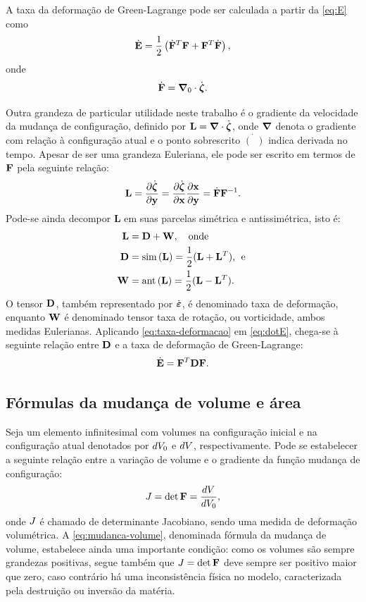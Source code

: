 \documentclass[Tese.tex]{subfiles}
\begin{document}
A taxa da deformação de Green-Lagrange pode ser calculada a partir da \cref{eq:E} como
\begin{equation}\label{eq:dotE}
\dot{\mathbf{E}} = \dfrac{1}{2}\left(\dot{\mathbf{F}}^T\mathbf{F}+\mathbf{F}^T\dot{\mathbf{F}}\right),
\end{equation}
onde 
\begin{equation}
\dot{\mathbf{F}} = \boldsymbol{\nabla}_0\cdot\dot{\boldsymbol{\zeta}}.
\end{equation}

Outra grandeza de particular utilidade neste trabalho é o gradiente da velocidade da mudança de configuração, definido por $\mathbf{L} = \boldsymbol{\nabla}\cdot\dot{\boldsymbol{\zeta}}$, onde $\boldsymbol{\nabla}$ denota o gradiente com relação à configuração atual e o ponto sobrescrito $\dot{(\;\,)}$ indica derivada no tempo. Apesar de ser uma grandeza Euleriana, ele pode ser escrito em termos de $\mathbf{F}$ pela seguinte relação:
\begin{equation}\label{eq:gradiente-velocidade}
\mathbf{L} = \dfrac{\partial\dot{\boldsymbol{\zeta}}}{\partial\mathbf{y}}=\dfrac{\partial\dot{\boldsymbol{\zeta}}}{\partial\mathbf{x}}\dfrac{\partial\mathbf{x}}{\partial\mathbf{y}} = \dot{\mathbf{F}}\mathbf{F}^{-1}.
\end{equation}
Pode-se ainda decompor $\mathbf{L}$ em suas parcelas simétrica e antissimétrica, isto é:
\begin{align}
\mathbf{L} &= \mathbf{D}+\mathbf{W}, \text{\quad onde} \\
\mathbf{D} &= \text{sim}\,(\mathbf{L})=\dfrac{1}{2}(\mathbf{L}+\mathbf{L}^T) \text{,\; e} \label{eq:taxa-deformacao} \\
\mathbf{W} &= \text{ant}\,(\mathbf{L})=\dfrac{1}{2}(\mathbf{L}-\mathbf{L}^T) \label{eq:vorticidade}  \text{.\quad\,\;}
\end{align}
O tensor $\mathbf{D}$, também representado por $\dot{\boldsymbol{\varepsilon}}$, é denominado taxa de deformação, enquanto $\mathbf{W}$ é denominado tensor taxa de rotação, ou vorticidade, ambos medidas Eulerianas. Aplicando \eqref{eq:taxa-deformacao} em \eqref{eq:dotE}, chega-se à seguinte relação entre $\mathbf{D}$ e a taxa de deformação de Green-Lagrange:
\begin{equation}
\dot{\mathbf{E}} = \mathbf{F}^{T}\mathbf{D}\mathbf{F} \text{.} \label{eq:taxa-green-2}
\end{equation}

\subsection{Fórmulas da mudança de volume e área}\label{sec:mudancavol}

Seja um elemento infinitesimal com volumes na configuração inicial e na configuração atual denotados por $dV_0$ e $dV$, respectivamente. Pode se estabelecer a seguinte relação entre a variação de volume e o gradiente da função mudança de configuração:
\begin{equation}\label{eq:mudanca-volume}
J = \det\mathbf{F} = \dfrac{dV_{\;}}{dV_0},
\end{equation}
onde $J$ é chamado de determinante Jacobiano, sendo uma medida de deformação volumétrica. A \cref{eq:mudanca-volume}, denominada fórmula da mudança de volume, estabelece ainda uma importante condição: como os volumes são sempre grandezas positivas, segue também que $J=\det\mathbf{F}$ deve sempre ser positivo maior que zero, caso contrário há uma inconsistência física no modelo, caracterizada pela destruição ou inversão da matéria.
\end{document}
